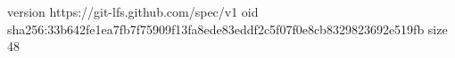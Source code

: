 version https://git-lfs.github.com/spec/v1
oid sha256:33b642fe1ea7fb7f75909f13fa8ede83eddf2c5f07f0e8cb8329823692e519fb
size 48
